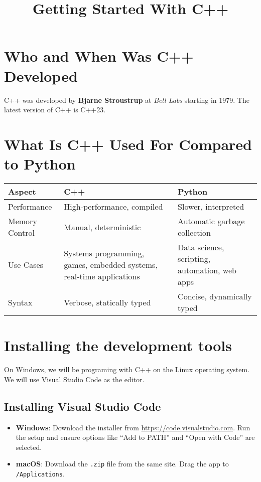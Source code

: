 \documentclass{article}
\title{Getting Started With C++}
\author{}
\date{}
\begin{document}
\maketitle



\section{Who and When Was C++ Developed}
C++ was developed by \textbf{Bjarne Stroustrup} at \textit{Bell Labs} starting in 1979. The latest version of C++ is C++23. 


\section*{What Is C++ Used For Compared to Python}

\begin{tabular}{|l|p{6cm}|p{6cm}|}
\hline
\textbf{Aspect} & \textbf{C++} & \textbf{Python} \\
\hline
Performance & High-performance, compiled & Slower, interpreted \\
Memory Control & Manual, deterministic & Automatic garbage collection \\
Use Cases & Systems programming, games, embedded systems, real-time applications & Data science, scripting, automation, web apps \\
Syntax & Verbose, statically typed & Concise, dynamically typed \\
\hline
\end{tabular}


\section{Installing the development tools}

On Windows, we will be programing with C++ on the Linux operating system. We will use Visual Studio Code as the editor.


\subsection{Installing Visual Studio Code}

\begin{itemize}[leftmargin=1.5em]
    \item \textbf{Windows}: Download the installer from \url{https://code.visualstudio.com}. Run the setup and ensure options like ``Add to PATH'' and ``Open with Code'' are selected.
    \item \textbf{macOS}: Download the \texttt{.zip} file from the same site. Drag the app to \texttt{/Applications}.
\end{itemize}
\end{document}
